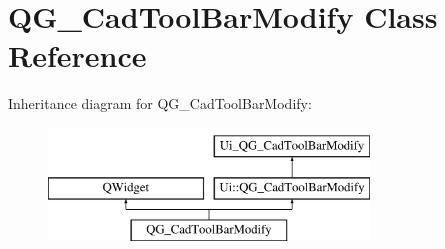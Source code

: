 \hypertarget{classQG__CadToolBarModify}{\section{Q\-G\-\_\-\-Cad\-Tool\-Bar\-Modify Class Reference}
\label{classQG__CadToolBarModify}
}
Inheritance diagram for Q\-G\-\_\-\-Cad\-Tool\-Bar\-Modify\-:\begin{figure}[H]
\begin{center}
\leavevmode
\includegraphics[height=3.000000cm]{classQG__CadToolBarModify}
\end{center}
\end{figure}
